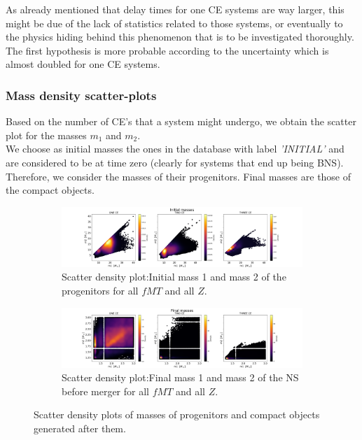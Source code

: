 \documentclass[preprint,12pt]{elsarticle}
\begin{document}
As already mentioned that delay times for one CE systems are way larger, this might be due of the lack of statistics related to those systems, or eventually to the physics hiding behind this phenomenon that is to be investigated thoroughly. The first hypothesis is more probable according to the uncertainty which is almost doubled for one CE systems.

\subsubsection{\textbf{Mass density scatter-plots}}

Based on the number of CE's that a system might undergo, we obtain the scatter plot for the masses $m_1$ and $m_2$.\\
We choose as initial masses the ones in the database with label \textit{'INITIAL'} and are considered to be at time zero (clearly for systems that end up being BNS). Therefore, we consider the masses of their progenitors. Final masses are those of the compact objects.

\begin{figure}[ht]
    \begin{subfigure}[t]{1\textwidth}
      \centering
      \includegraphics[width=1\textwidth]{Images/Initial masses_scatter.png}
      \caption{Scatter density plot:Initial mass 1 and mass 2 of the progenitors for all $fMT$ and all $Z$.}
    \label{img:scatter_initial}
    \end{subfigure}
    \begin{subfigure}[t]{1\textwidth}
      \centering
      \includegraphics[width=1\textwidth]{Images/Final masses_scatter.png}
      \caption{Scatter density plot:Final mass 1 and mass 2 of the NS before merger for all $fMT$ and all $Z$.}
    \label{img:scatter_final}
    \end{subfigure}
    \caption{Scatter density plots of masses of progenitors and compact objects generated after them.}
    \label{img:scatter_plots}
 \end{figure}
\end{document}
